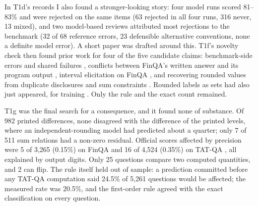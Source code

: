 \documentclass[11pt]{article}
\begin{document}
In T1d's records I also found a stronger-looking story: four model runs scored 81--83\% and were rejected on the same items (63 rejected in all four runs, 316 never, 13 mixed), and two model-based reviews attributed most rejections to the benchmark (32 of 68 reference errors, 23 defensible alternative conventions, none a definite model error). A short paper was drafted around this. T1f's novelty check then found prior work for four of the five candidate claims: benchmark-side errors and shared failures \citep{tang2025financereasoning,finesse2026}, conflicts between FinQA's written answer and its program output \citep{envcommons2026pr4}, interval elicitation on FinQA \citep{bahaj2025gauging}, and recovering rounded values from duplicate disclosures and sum constraints \citep{xbrl2023calc,dandekar2010ineffectiveness}. Rounded labels as sets had also just appeared, for training \citep{yan2026training}. Only the rule and the exact count remained.

T1g was the final search for a consequence, and it found none of substance. Of 982 printed differences, none disagreed with the difference of the printed levels, where an independent-rounding model had predicted about a quarter; only 7 of 511 sum relations had a non-zero residual. Official scores affected by precision were 5 of 3,265 (0.15\%) on FinQA and 16 of 4,524 (0.35\%) on TAT-QA \citep{zhu-etal-2021-tat}, all explained by output digits. Only 25 questions compare two computed quantities, and 2 can flip. The rule itself held out of sample: a prediction committed before any TAT-QA computation said 24.5\% of 5,261 questions would be affected; the measured rate was 20.5\%, and the first-order rule agreed with the exact classification on every question.
\end{document}
